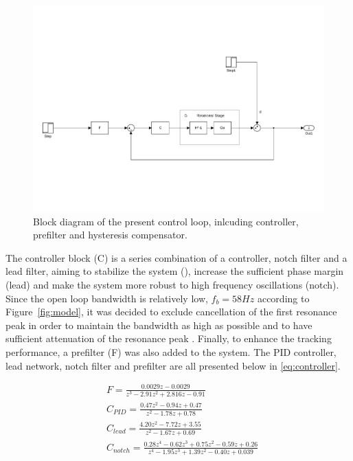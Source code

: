 \begin{figure}[h]
  \centering %
  \includegraphics[width=1\textwidth, trim=4cm 3cm 2.1cm 10cm, clip=true]{fig/matlab/present_controller}
  \caption{\label{fig:present}Block diagram of the present control loop, inlcuding controller, prefilter and hysteresis compensator.}
\end{figure}

The controller block (C) is a series combination of a \abbrPID controller, notch filter and a lead filter, aiming to stabilize the system (\abbrPID), increase the sufficient phase margin (lead) and make the system more robust to high frequency oscillations (notch). Since the open loop bandwidth is relatively low, $f_b = 58 Hz$ according to Figure~\ref{fig:model}, it was decided to exclude cancellation of the first resonance peak in order to maintain the bandwidth as high as possible and to have sufficient attenuation of the resonance peak \citep{ButcherController:2015}. Finally, to enhance the tracking performance, a prefilter (F) was also added to the system. The PID controller, lead network, notch filter and prefilter are all presented below in \eqref{eq:controller}.

\begin{subequations}
  \label{eq:controller}
\begin{alignat}{2}
  \label{eq:pre}
  & F = \frac{0.0029z - 0.0029}{z^3 - 2.91z^2 + 2.816 z - 0.91} \\
  \label{eq:pid}
  & C_{PID} = \frac{0.47z^2 - 0.94z + 0.47}{z^2 - 1.78 z + 0.78} \\
  \label{eq:lead}
  & C_{lead} = \frac{4.20 z^2 - 7.72z + 3.55}{z^2 - 1.67z + 0.69} \\
  \label{eq:notch}
  & C_{notch} = \frac{0.28z^4 - 0.62z^3 + 0.75z^2 - 0.59z + 0.26}{z^4 - 1.95z^3 + 1.39z^2 - 0.40z + 0.039}
\end{alignat}
\end{subequations}

